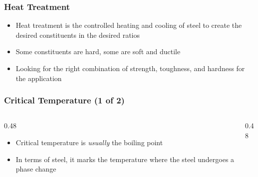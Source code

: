\begin{frame}
	\frametitle{Heat Treatment}

    \begin{itemize}[<+- | alert@+>]
        \item Heat treatment is the controlled heating and cooling of steel to create the desired constituents in the desired ratios
        \item Some constituents are hard, some are soft and ductile
        \item Looking for the right combination of strength, toughness, and hardness for the application
    \end{itemize}
\end{frame}

\begin{frame}
	\frametitle{Critical Temperature (1 of 2)}

    \begin{columns}
        \begin{column}{0.48\linewidth}
            \begin{itemize}[<+- | alert@+>]
                \item Critical temperature is \emph{usually} the boiling point
                \item In terms of steel, it marks the temperature where the steel undergoes a phase change
            \end{itemize}
        \end{column}
        \begin{column}{0.48\linewidth}
        \end{column}
    \end{columns}
\end{frame}

